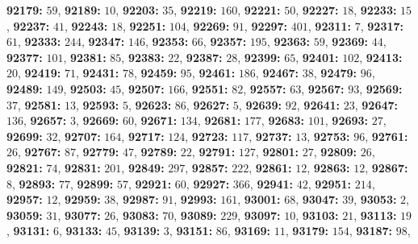 \textsf{\bfseries 92179:} $59$, \textsf{\bfseries 92189:} $10$, \textsf{\bfseries 92203:} $35$, \textsf{\bfseries 92219:} $160$, \textsf{\bfseries 92221:} $50$, \textsf{\bfseries 92227:} $18$, \textsf{\bfseries 92233:} $15$, \textsf{\bfseries 92237:} $41$, \textsf{\bfseries 92243:} $18$, \textsf{\bfseries 92251:} $104$, \textsf{\bfseries 92269:} $91$, \textsf{\bfseries 92297:} $401$, \textsf{\bfseries 92311:} $7$, \textsf{\bfseries 92317:} $61$, \textsf{\bfseries 92333:} $244$, \textsf{\bfseries 92347:} $146$, \textsf{\bfseries 92353:} $66$, \textsf{\bfseries 92357:} $195$, \textsf{\bfseries 92363:} $59$, \textsf{\bfseries 92369:} $44$, \textsf{\bfseries 92377:} $101$, \textsf{\bfseries 92381:} $85$, \textsf{\bfseries 92383:} $22$, \textsf{\bfseries 92387:} $28$, \textsf{\bfseries 92399:} $65$, \textsf{\bfseries 92401:} $102$, \textsf{\bfseries 92413:} $20$, \textsf{\bfseries 92419:} $71$, \textsf{\bfseries 92431:} $78$, \textsf{\bfseries 92459:} $95$, \textsf{\bfseries 92461:} $186$, \textsf{\bfseries 92467:} $38$, \textsf{\bfseries 92479:} $96$, \textsf{\bfseries 92489:} $149$, \textsf{\bfseries 92503:} $45$, \textsf{\bfseries 92507:} $166$, \textsf{\bfseries 92551:} $82$, \textsf{\bfseries 92557:} $63$, \textsf{\bfseries 92567:} $93$, \textsf{\bfseries 92569:} $37$, \textsf{\bfseries 92581:} $13$, \textsf{\bfseries 92593:} $5$, \textsf{\bfseries 92623:} $86$, \textsf{\bfseries 92627:} $5$, \textsf{\bfseries 92639:} $92$, \textsf{\bfseries 92641:} $23$, \textsf{\bfseries 92647:} $136$, \textsf{\bfseries 92657:} $3$, \textsf{\bfseries 92669:} $60$, \textsf{\bfseries 92671:} $134$, \textsf{\bfseries 92681:} $177$, \textsf{\bfseries 92683:} $101$, \textsf{\bfseries 92693:} $27$, \textsf{\bfseries 92699:} $32$, \textsf{\bfseries 92707:} $164$, \textsf{\bfseries 92717:} $124$, \textsf{\bfseries 92723:} $117$, \textsf{\bfseries 92737:} $13$, \textsf{\bfseries 92753:} $96$, \textsf{\bfseries 92761:} $26$, \textsf{\bfseries 92767:} $87$, \textsf{\bfseries 92779:} $47$, \textsf{\bfseries 92789:} $22$, \textsf{\bfseries 92791:} $127$, \textsf{\bfseries 92801:} $27$, \textsf{\bfseries 92809:} $26$, \textsf{\bfseries 92821:} $74$, \textsf{\bfseries 92831:} $201$, \textsf{\bfseries 92849:} $297$, \textsf{\bfseries 92857:} $222$, \textsf{\bfseries 92861:} $12$, \textsf{\bfseries 92863:} $12$, \textsf{\bfseries 92867:} $8$, \textsf{\bfseries 92893:} $77$, \textsf{\bfseries 92899:} $57$, \textsf{\bfseries 92921:} $60$, \textsf{\bfseries 92927:} $366$, \textsf{\bfseries 92941:} $42$, \textsf{\bfseries 92951:} $214$, \textsf{\bfseries 92957:} $12$, \textsf{\bfseries 92959:} $38$, \textsf{\bfseries 92987:} $91$, \textsf{\bfseries 92993:} $161$, \textsf{\bfseries 93001:} $68$, \textsf{\bfseries 93047:} $39$, \textsf{\bfseries 93053:} $2$, \textsf{\bfseries 93059:} $31$, \textsf{\bfseries 93077:} $26$, \textsf{\bfseries 93083:} $70$, \textsf{\bfseries 93089:} $229$, \textsf{\bfseries 93097:} $10$, \textsf{\bfseries 93103:} $21$, \textsf{\bfseries 93113:} $19$, \textsf{\bfseries 93131:} $6$, \textsf{\bfseries 93133:} $45$, \textsf{\bfseries 93139:} $3$, \textsf{\bfseries 93151:} $86$, \textsf{\bfseries 93169:} $11$, \textsf{\bfseries 93179:} $154$, \textsf{\bfseries 93187:} $98$, 
